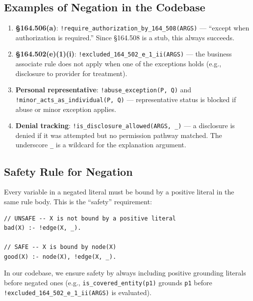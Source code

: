 \documentclass[11pt,letterpaper]{article}
\begin{document}
\subsection{Examples of Negation in the Codebase}

\begin{enumerate}
  \item \textbf{\S 164.506(a)}: \texttt{!require\_authorization\_by\_164\_508(ARGS)} --- ``except when authorization is required.'' Since \S 164.508 is a stub, this always succeeds.

  \item \textbf{\S 164.502(e)(1)(i)}: \texttt{!excluded\_164\_502\_e\_1\_ii(ARGS)} --- the business associate rule does not apply when one of the exceptions holds (e.g., disclosure to provider for treatment).

  \item \textbf{Personal representative}: \texttt{!abuse\_exception(P,~Q)} and \texttt{!minor\_acts\_as\_\allowbreak{}individual(P,~Q)} --- representative status is blocked if abuse or minor exception applies.

  \item \textbf{Denial tracking}: \texttt{!is\_disclosure\_allowed(ARGS, \_)} --- a disclosure is denied if it was attempted but no permission pathway matched. The underscore \texttt{\_} is a wildcard for the explanation argument.
\end{enumerate}

\subsection{Safety Rule for Negation}

Every variable in a negated literal must be bound by a positive literal in the same rule body. This is the ``safety'' requirement:

\begin{lstlisting}[style=soufflestyle]
// UNSAFE -- X is not bound by a positive literal
bad(X) :- !edge(X, _).

// SAFE -- X is bound by node(X)
good(X) :- node(X), !edge(X, _).
\end{lstlisting}

In our codebase, we ensure safety by always including positive grounding literals before negated ones (e.g., \texttt{is\_covered\_entity(p1)} grounds \texttt{p1} before \texttt{!excluded\_164\_502\_e\_1\_ii(ARGS)} is evaluated).


\end{document}
